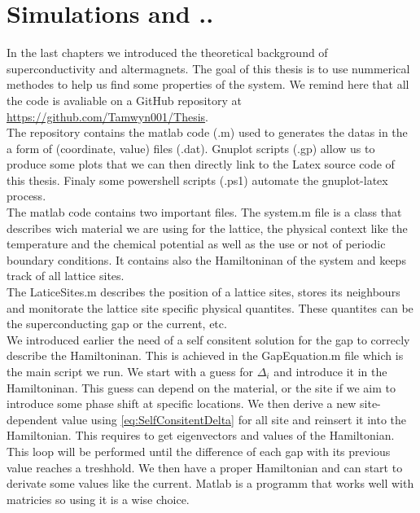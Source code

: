 \documentclass[../main.tex]{subfile}
\begin{document}
\section{Simulations and ..}
In the last chapters we introduced the theoretical background of superconductivity and altermagnets. 
The goal of this thesis is to use nummerical methodes to help us find some properties of the system.
We remind here that all the code is avaliable on a GitHub repository at \url{https://github.com/Tamwyn001/Thesis}. \\

The repository contains the matlab code (.m) used to generates the datas in the a form of (coordinate, value) files (.dat).
Gnuplot scripts (.gp) allow us to produce some plots that we can then directly link to the Latex source code
of this thesis. Finaly some powershell scripts (.ps1) automate the gnuplot-latex process.\\

The matlab code contains two important files. The system.m file is a class that describes wich
 material we are using for the lattice, the physical context like the temperature and the chemical potential
as well as the use or not of periodic boundary conditions. It contains also the Hamiltoninan of the system
and keeps track of all lattice sites.\\
The LaticeSites.m describes the position of a lattice sites, stores its neighbours and monitorate the lattice
site specific physical quantites. These quantites can be the superconducting gap or the current, etc.\\

We introduced earlier the need of a self consitent solution for the gap to correcly describe the Hamiltoninan.
This is achieved in the GapEquation.m file which is the main script we run. We start with a guess for
$\Delta_i$ and introduce it in the Hamiltoninan. This guess can depend on the material, or the site 
if we aim to introduce some phase shift at specific locations.
We then derive a new site-dependent value using \ref{eq:SelfConsitentDelta} for all site and
reinsert it into the Hamiltonian. This requires to get eigenvectors and values of the Hamiltonian. This loop will be 
performed until the difference of each gap with its previous value reaches a treshhold. We then have a proper 
Hamiltonian and can start to derivate some values like the current. 
Matlab is a programm that works well with matricies so using it is a wise choice.\\
\end{document}
